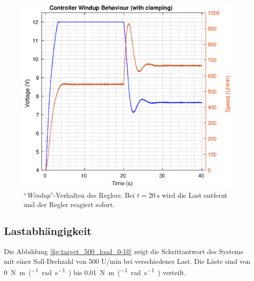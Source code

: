 \begin{figure}[H]
    \centering
    \includegraphics[width=\imagewidth]{images/windup_clamping}
    \caption{``\textit{Windup}''-Verhalten des Reglers. Bei $t=\SI{20}{\second}$ wird die Last entfernt und der Regler reagiert sofort.}
    \label{fig:windup_clamping}
\end{figure}


\subsection{Lastabh\"angigkeit}

Die  Abbildung  \ref{fig:target_500_load_0-10}  zeigt die  Schrittantwort  des
Systems mit einer Soll-Drehzahl von 500  U/min  bei  verschiedener  Last.  Die
L\"aste    sind    von    \SI{0}{\newton\meter\per(\radian\per\second)}    bis
\SI{0.01}{\newton\meter\per(\radian\per\second)} verteilt.

